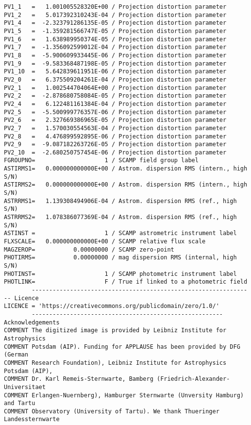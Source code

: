 \documentclass[11pt]{ivoa}
\begin{document}
\begin{lstlisting}
PV1_1   =   1.001005528320E+00 / Projection distortion parameter
PV1_2   =   5.017392310243E-04 / Projection distortion parameter
PV1_4   =  -2.323791286135E-05 / Projection distortion parameter
PV1_5   =  -1.359281566747E-05 / Projection distortion parameter
PV1_6   =   1.638989950374E-05 / Projection distortion parameter
PV1_7   =  -1.356092599012E-04 / Projection distortion parameter
PV1_8   =  -5.900609933445E-06 / Projection distortion parameter
PV1_9   =  -9.583368487198E-05 / Projection distortion parameter
PV1_10  =   5.642839611951E-06 / Projection distortion parameter
PV2_0   =   6.375509204261E-04 / Projection distortion parameter
PV2_1   =   1.002544704064E+00 / Projection distortion parameter
PV2_2   =  -2.878680758084E-05 / Projection distortion parameter
PV2_4   =   6.122481161384E-04 / Projection distortion parameter
PV2_5   =  -5.500999776357E-06 / Projection distortion parameter
PV2_6   =   2.327669386965E-05 / Projection distortion parameter
PV2_7   =   1.570030554563E-04 / Projection distortion parameter
PV2_8   =   4.476899592895E-06 / Projection distortion parameter
PV2_9   =  -9.087182263726E-05 / Projection distortion parameter
PV2_10  =  -2.680250757454E-06 / Projection distortion parameter
FGROUPNO=                    1 / SCAMP field group label
ASTIRMS1=   0.000000000000E+00 / Astrom. dispersion RMS (intern., high S/N)
ASTIRMS2=   0.000000000000E+00 / Astrom. dispersion RMS (intern., high S/N)
ASTRRMS1=   1.139308494906E-04 / Astrom. dispersion RMS (ref., high S/N)
ASTRRMS2=   1.078386077369E-04 / Astrom. dispersion RMS (ref., high S/N)
ASTINST =                    1 / SCAMP astrometric instrument label
FLXSCALE=   0.000000000000E+00 / SCAMP relative flux scale
MAGZEROP=           0.00000000 / SCAMP zero-point
PHOTIRMS=           0.00000000 / mag dispersion RMS (internal, high S/N)
PHOTINST=                    1 / SCAMP photometric instrument label
PHOTLINK=                    F / True if linked to a photometric field
        ---------------------------------------------------------------- Licence
LICENCE = 'https://creativecommons.org/publicdomain/zero/1.0/'
        ------------------------------------------------------- Acknowledgements
COMMENT The digitized image is provided by Leibniz Institute for Astrophysics
COMMENT Potsdam (AIP). Funding for APPLAUSE has been provided by DFG (German
COMMENT Research Foundation), Leibniz Institute for Astrophysics Potsdam (AIP),
COMMENT Dr. Karl Remeis-Sternwarte, Bamberg (Friedrich-Alexander-Universitaet
COMMENT Erlangen-Nuernberg), Hamburger Sternwarte (Unversity Hamburg) and Tartu
COMMENT Observatory (University of Tartu). We thank Thueringer Landessternwarte

\end{lstlisting}
\end{document}
